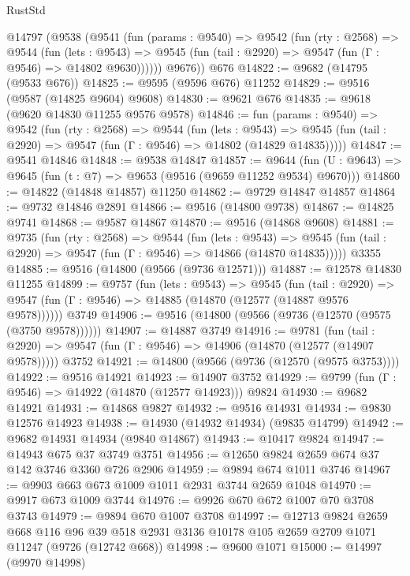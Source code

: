 \begin{lexlean}{RustStd}
\begin{coremodule}
    @14797
      (@9538
        (@9541
          (fun (params : @9540) =>
          @9542
            (fun (rty : @2568) =>
            @9544
              (fun (lets : @9543) =>
              @9545 (fun (tail : @2920) => @9547 (fun (Γ : @9546) => @14802 @9630))))))
        @9676))
    @676
@14822 := @9682 (@14795 (@9533 @676))
@14825 := @9595 (@9596 @676) @11252
@14829 := @9516 (@9587 (@14825 @9604) @9608)
@14830 := @9621 @676
@14835 := @9618 (@9620 @14830 @11255 @9576 @9578)
@14846 := fun (params : @9540) =>
  @9542
    (fun (rty : @2568) =>
    @9544
      (fun (lets : @9543) =>
      @9545 (fun (tail : @2920) => @9547 (fun (Γ : @9546) => @14802 (@14829 @14835)))))
@14847 := @9541 @14846
@14848 := @9538 @14847
@14857 := @9644
    (fun (U : @9643) => @9645 (fun (t : @7) => @9653 (@9516 (@9659 @11252 @9534) @9670)))
@14860 := @14822 (@14848 @14857) @11250
@14862 := @9729 @14847 @14857
@14864 := @9732 @14846 @2891
@14866 := @9516 (@14800 @9738)
@14867 := @14825 @9741
@14868 := @9587 @14867
@14870 := @9516 (@14868 @9608)
@14881 := @9735
    (fun (rty : @2568) =>
    @9544
      (fun (lets : @9543) =>
      @9545 (fun (tail : @2920) => @9547 (fun (Γ : @9546) => @14866 (@14870 @14835)))))
    @3355
@14885 := @9516 (@14800 (@9566 (@9736 @12571)))
@14887 := @12578 @14830 @11255
@14899 := @9757
    (fun (lets : @9543) =>
    @9545
      (fun (tail : @2920) =>
      @9547 (fun (Γ : @9546) => @14885 (@14870 (@12577 (@14887 @9576 @9578))))))
    @3749
@14906 := @9516 (@14800 (@9566 (@9736 (@12570 (@9575 (@3750 @9578))))))
@14907 := @14887 @3749
@14916 := @9781
    (fun (tail : @2920) => @9547 (fun (Γ : @9546) => @14906 (@14870 (@12577 (@14907 @9578)))))
    @3752
@14921 := @14800 (@9566 (@9736 (@12570 (@9575 @3753))))
@14922 := @9516 @14921
@14923 := @14907 @3752
@14929 := @9799 (fun (Γ : @9546) => @14922 (@14870 (@12577 @14923))) @9824
@14930 := @9682 @14921
@14931 := @14868 @9827
@14932 := @9516 @14931
@14934 := @9830 @12576 @14923
@14938 := @14930 (@14932 @14934) (@9835 @14799)
@14942 := @9682 @14931 @14934 (@9840 @14867)
@14943 := @10417 @9824
@14947 := @14943 @675 @37 @3749 @3751
@14956 := @12650 @9824 @2659 @674 @37 @142 @3746 @3360 @726 @2906
@14959 := @9894 @674 @1011 @3746
@14967 := @9903 @663 @673 @1009 @1011 @2931 @3744 @2659 @1048
@14970 := @9917 @673 @1009 @3744
@14976 := @9926 @670 @672 @1007 @70 @3708 @3743
@14979 := @9894 @670 @1007 @3708
@14997 := @12713
    @9824
    @2659
    @668
    @116
    @96
    @39
    @518
    @2931
    @3136
    @10178
    @105
    @2659
    @2709
    @1071
    @11247
    (@9726 (@12742 @668))
@14998 := @9600 @1071
@15000 := @14997 (@9970 @14998)

\end{coremodule}
\end{lexlean}
